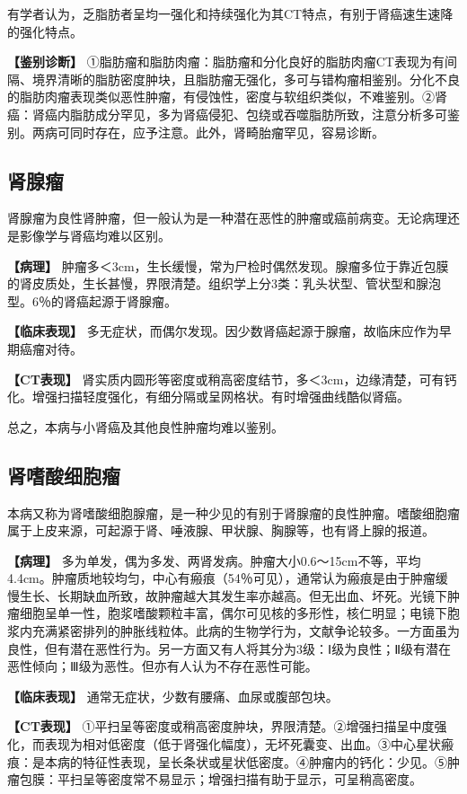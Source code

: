 有学者认为，乏脂肪者呈均一强化和持续强化为其CT特点，有别于肾癌速生速降的强化特点。

\textbf{【鉴别诊断】}
①脂肪瘤和脂肪肉瘤：脂肪瘤和分化良好的脂肪肉瘤CT表现为有间隔、境界清晰的脂肪密度肿块，且脂肪瘤无强化，多可与错构瘤相鉴别。分化不良的脂肪肉瘤表现类似恶性肿瘤，有侵蚀性，密度与软组织类似，不难鉴别。②肾癌：肾癌内脂肪成分罕见，多为肾癌侵犯、包绕或吞噬脂肪所致，注意分析多可鉴别。两病可同时存在，应予注意。此外，肾畸胎瘤罕见，容易诊断。

\subsection{肾腺瘤}

肾腺瘤为良性肾肿瘤，但一般认为是一种潜在恶性的肿瘤或癌前病变。无论病理还是影像学与肾癌均难以区别。

\textbf{【病理】}
肿瘤多＜3cm，生长缓慢，常为尸检时偶然发现。腺瘤多位于靠近包膜的肾皮质处，生长甚慢，界限清楚。组织学上分3类：乳头状型、管状型和腺泡型。6％的肾癌起源于肾腺瘤。

\textbf{【临床表现】}
多无症状，而偶尔发现。因少数肾癌起源于腺瘤，故临床应作为早期癌瘤对待。

\textbf{【CT表现】}
肾实质内圆形等密度或稍高密度结节，多＜3cm，边缘清楚，可有钙化。增强扫描轻度强化，有细分隔或呈网格状。有时增强曲线酷似肾癌。

总之，本病与小肾癌及其他良性肿瘤均难以鉴别。

\subsection{肾嗜酸细胞瘤}

本病又称为肾嗜酸细胞腺瘤，是一种少见的有别于肾腺瘤的良性肿瘤。嗜酸细胞瘤属于上皮来源，可起源于肾、唾液腺、甲状腺、胸腺等，也有肾上腺的报道。

\textbf{【病理】}
多为单发，偶为多发、两肾发病。肿瘤大小0.6～15cm不等，平均4.4cm。肿瘤质地较均匀，中心有瘢痕（54％可见），通常认为瘢痕是由于肿瘤缓慢生长、长期缺血所致，故肿瘤越大其发生率亦越高。但无出血、坏死。光镜下肿瘤细胞呈单一性，胞浆嗜酸颗粒丰富，偶尔可见核的多形性，核仁明显；电镜下胞浆内充满紧密排列的肿胀线粒体。此病的生物学行为，文献争论较多。一方面虽为良性，但有潜在恶性行为。另一方面又有人将其分为3级：Ⅰ级为良性；Ⅱ级有潜在恶性倾向；Ⅲ级为恶性。但亦有人认为不存在恶性可能。

\textbf{【临床表现】} 通常无症状，少数有腰痛、血尿或腹部包块。

\textbf{【CT表现】}
①平扫呈等密度或稍高密度肿块，界限清楚。②增强扫描呈中度强化，而表现为相对低密度（低于肾强化幅度），无坏死囊变、出血。③中心星状瘢痕：是本病的特征性表现，呈长条状或星状低密度。④肿瘤内的钙化：少见。⑤肿瘤包膜：平扫呈等密度常不易显示；增强扫描有助于显示，可呈稍高密度。

